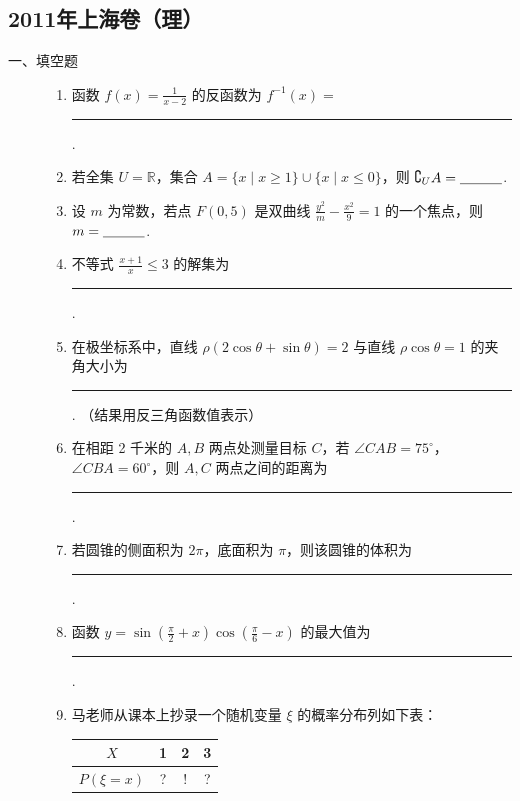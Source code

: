 \subsection{2011年上海卷（理）}\label{gk:2011年上海卷（理）}

\begin{description}

    \item[一、填空题]

    \begin{enumerate}[leftmargin=5pt]

        \item 函数 \( f(x) = \frac{1}{x - 2} \) 的反函数为 \( f^{-1}(x) = \)\rule[-0.3ex]{3em}{0.4pt}.

        \item 若全集 \(U = \mathbb{R}\)，集合 \(A = \{x \mid x \geqslant 1\} \cup \{x \mid x \leqslant 0\}\)，则 \(\complement_U A =\rule[-0.3ex]{3em}{0.4pt}\).

        \item 设 \(m\) 为常数，若点 \(F(0,5)\) 是双曲线 \(\frac{y^2}{m} - \frac{x^2}{9} = 1\) 的一个焦点，则 \(m =\rule[-0.3ex]{3em}{0.4pt}\).

        \item 不等式 \(\frac{x + 1}{x} \leqslant 3\) 的解集为\rule[-0.3ex]{3em}{0.4pt}.

        \item 在极坐标系中，直线 \(\rho(2\cos \theta + \sin \theta) = 2\) 与直线 \(\rho\cos \theta = 1\) 的夹角大小为\rule[-0.3ex]{3em}{0.4pt}. （结果用反三角函数值表示）

        \item 在相距 2 千米的 \(A, B\) 两点处测量目标 \(C\)，若 \(\angle CAB = 75^{\circ}\)，\(\angle CBA = 60^{\circ}\)，则 \(A, C\) 两点之间的距离为\rule[-0.3ex]{3em}{0.4pt}.

        \item 若圆锥的侧面积为 \(2\pi\)，底面积为 \(\pi\)，则该圆锥的体积为\rule[-0.3ex]{3em}{0.4pt}.

        \item 函数 \( y = \sin \left(\frac{\pi}{2} + x\right) \cos \left(\frac{\pi}{6} - x\right) \) 的最大值为\rule[-0.3ex]{3em}{0.4pt}.

        \item 马老师从课本上抄录一个随机变量 \(\xi\) 的概率分布列如下表：

\begin{center}
\begin{tabular}{|c|c|c|c|}
\hline
\(X\) & 1 & 2 & 3 \\
\hline
\(P(\xi=x)\) & ? & ! & ? \\
\hline
\end{tabular}
\end{center}


\end{enumerate}
\end{description}
